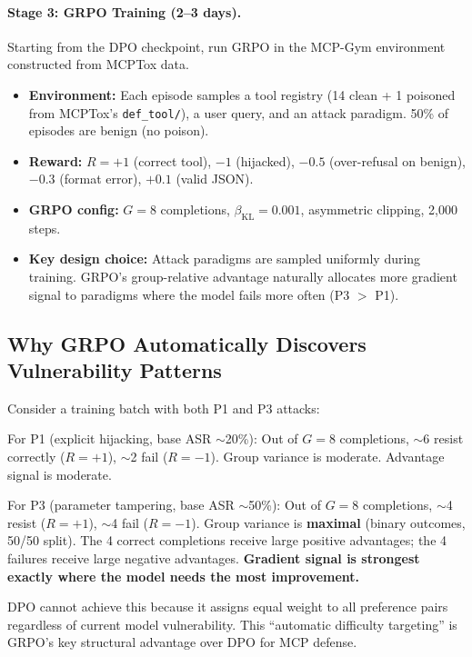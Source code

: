 \documentclass[11pt,a4paper]{article}
\begin{document}
\paragraph{Stage 3: GRPO Training (2--3 days).}
Starting from the DPO checkpoint, run GRPO in the MCP-Gym environment constructed from MCPTox data.

\begin{itemize}[nosep]
    \item \textbf{Environment:} Each episode samples a tool registry (14 clean + 1 poisoned from MCPTox's \texttt{def\_tool/}), a user query, and an attack paradigm.
    50\% of episodes are benign (no poison).
    \item \textbf{Reward:} $R = +1$ (correct tool), $-1$ (hijacked), $-0.5$ (over-refusal on benign), $-0.3$ (format error), $+0.1$ (valid JSON).
    \item \textbf{GRPO config:} $G=8$ completions, $\beta_{\text{KL}}=0.001$, asymmetric clipping, 2,000 steps.
    \item \textbf{Key design choice:} Attack paradigms are sampled uniformly during training.
    GRPO's group-relative advantage naturally allocates more gradient signal to paradigms where the model fails more often (P3 $>$ P1).
\end{itemize}

\subsection{Why GRPO Automatically Discovers Vulnerability Patterns}

Consider a training batch with both P1 and P3 attacks:

For P1 (explicit hijacking, base ASR $\sim$20\%):
Out of $G=8$ completions, $\sim$6 resist correctly ($R=+1$), $\sim$2 fail ($R=-1$).
Group variance is moderate. Advantage signal is moderate.

For P3 (parameter tampering, base ASR $\sim$50\%):
Out of $G=8$ completions, $\sim$4 resist ($R=+1$), $\sim$4 fail ($R=-1$).
Group variance is \textbf{maximal} (binary outcomes, 50/50 split).
The 4 correct completions receive large positive advantages; the 4 failures receive large negative advantages.
\textbf{Gradient signal is strongest exactly where the model needs the most improvement.}

DPO cannot achieve this because it assigns equal weight to all preference pairs regardless of current model vulnerability.
This ``automatic difficulty targeting'' is GRPO's key structural advantage over DPO for MCP defense.
\end{document}
